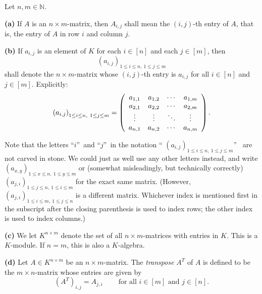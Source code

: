 \begin{convention}
\label{conv.det.matrices}Let $n,m\in\mathbb{N}$. \medskip

\textbf{(a)} If $A$ is an $n\times m$-matrix, then $A_{i,j}$ shall mean the
$\left(  i,j\right)  $-th entry of $A$, that is, the entry of $A$ in row $i$
and column $j$. \medskip

\textbf{(b)} If $a_{i,j}$ is an element of $K$ for each $i\in\left[  n\right]
$ and each $j\in\left[  m\right]  $, then
\[
\left(  a_{i,j}\right)  _{1\leq i\leq n,\ 1\leq j\leq m}%
\]
shall denote the $n\times m$-matrix whose $\left(  i,j\right)  $-th entry is
$a_{i,j}$ for all $i\in\left[  n\right]  $ and $j\in\left[  m\right]  $.
Explicitly:%
\[
\left(  a_{i,j}\right)  _{1\leq i\leq n,\ 1\leq j\leq m}=\left(
\begin{array}
[c]{cccc}%
a_{1,1} & a_{1,2} & \cdots & a_{1,m}\\
a_{2,1} & a_{2,2} & \cdots & a_{2,m}\\
\vdots & \vdots & \ddots & \vdots\\
a_{n,1} & a_{n,2} & \cdots & a_{n,m}%
\end{array}
\right)  .
\]


Note that the letters \textquotedblleft$i$\textquotedblright\ and
\textquotedblleft$j$\textquotedblright\ in the notation \textquotedblleft%
$\left(  a_{i,j}\right)  _{1\leq i\leq n,\ 1\leq j\leq m}$\textquotedblright%
\ are not carved in stone. We could just as well use any other letters
instead, and write $\left(  a_{x,y}\right)  _{1\leq x\leq n,\ 1\leq y\leq m}$
or (somewhat misleadingly, but technically correctly) $\left(  a_{j,i}\right)
_{1\leq j\leq n,\ 1\leq i\leq m}$ for the exact same matrix. (However,
$\left(  a_{j,i}\right)  _{1\leq i\leq m,\ 1\leq j\leq n}$ is a different
matrix. Whichever index is mentioned first in the subscript after the closing
parenthesis is used to index rows; the other index is used to index columns.)
\medskip

\textbf{(c)} We let $K^{n\times m}$ denote the set of all $n\times m$-matrices
with entries in $K$. This is a $K$-module. If $n=m$, this is also a
$K$-algebra. \medskip

\textbf{(d)} Let $A\in K^{n\times m}$ be an $n\times m$-matrix. The
\emph{transpose} $A^{T}$ of $A$ is defined to be the $m\times n$-matrix whose
entries are given by%
\[
\left(  A^{T}\right)  _{i,j}=A_{j,i}\ \ \ \ \ \ \ \ \ \ \text{for all }%
i\in\left[  m\right]  \text{ and }j\in\left[  n\right]  .
\]

\end{convention}

